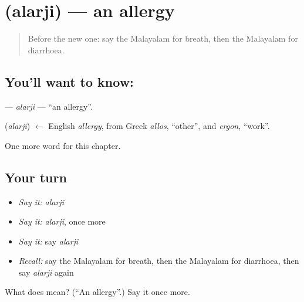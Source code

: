 \section[\texorpdfstring{\ml{അലർജി} (alarji)}{അലർജി (alarji)}]{ (alarji) — an allergy}

\label{lesson:ML-C233-alarji}



\begin{quote}
Before the new one: say the Malayalam for breath, then the Malayalam for diarrhoea.
\end{quote}

\subsection*{You'll want to know: }
\textbf{} — \emph{alarji} — \textquotedblleft{}an allergy\textquotedblright{}.

\begin{cousinweb}
\textbf{} (\emph{alarji}) $\leftarrow$ English \emph{allergy}, from Greek \emph{allos}, \textquotedblleft{}other\textquotedblright{}, and \emph{ergon}, \textquotedblleft{}work\textquotedblright{}.
\end{cousinweb}

\begin{grammarlens}[title={What you've built}]
One more word for this chapter.
\end{grammarlens}

\subsection*{Your turn}
\begin{itemize}
\raggedright
  \item \emph{Say it:} \emph{alarji}
  \item \emph{Say it:} \emph{alarji}, once more
  \item \emph{Say it:} say \emph{alarji}
  \item \emph{Recall:} say the Malayalam for breath, then the Malayalam for diarrhoea, then say \emph{alarji} again
\end{itemize}

\begin{tcolorbox}[breakable,colback=teal!4,colframe=teal!35!black,title={Before you move on}]
What does  mean? (\textquotedblleft{}An allergy\textquotedblright{}.) Say it once more.
\end{tcolorbox}
